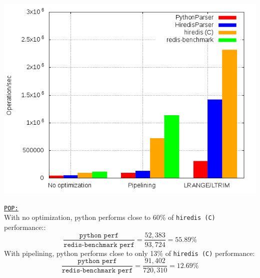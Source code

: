 \documentclass[a4paper, 11pt]{report}
\begin{document}
\begin{minipage}{0.55\linewidth}
    \includegraphics[width=1.0\linewidth]{plots/poping.png}
\end{minipage}
\begin{minipage}{0.4\linewidth}
    \underline{\texttt{POP:}}\\

    With no optimization, python performs close to 60\% of \texttt{hiredis (C)} performance::
    $$\frac{\texttt{python perf}}{\texttt{redis-benchmark perf}}=\frac{52,383}{93,724}=55.89\%$$
    With pipelining, python performs close to only 13\% of \texttt{hiredis (C)} performance:
    $$\frac{\texttt{python perf}}{\texttt{redis-benchmark perf}}=\frac{91,402}{720,310}=12.69\%$$
\end{minipage}
\end{document}
